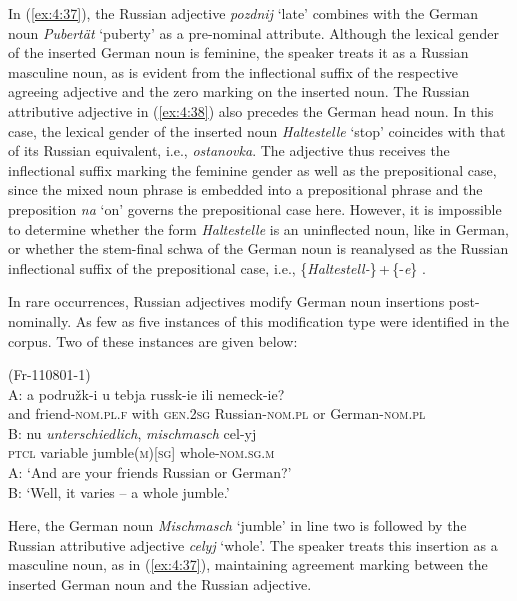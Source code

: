 \noindent In (\ref{ex:4:37}), the Russian adjective \textit{pozdnij} `late' combines with the German noun \textit{Pubertät} `puberty' as a pre-nominal attribute. Although the lexical gender of the inserted German noun is feminine, the speaker treats it as a Russian masculine noun, as is evident from the inflectional suffix of the respective agreeing adjective and the zero marking on the inserted noun. The Russian attributive adjective in (\ref{ex:4:38}) also precedes the German head noun. In this case, the lexical gender of the inserted noun \textit{Haltestelle} `stop' coincides with that of its Russian equivalent, i.e., \textit{ostanovka}. The adjective thus receives the inflectional suffix marking the feminine gender as well as the prepositional case, since the mixed noun phrase is embedded into a prepositional phrase and the preposition \textit{na} `on' governs the prepositional case here. However, it is impossible to determine whether the form \textit{Haltestelle} is an uninflected noun, like in German, or whether the stem-final schwa of the German noun is reanalysed as the Russian inflectional suffix of the prepositional case, i.e., \{\textit{Haltestell-}\}\,+\,\{{-\textit{e}}\} \citep[cf.][276]{zdan-trubc-01}.

In rare occurrences, Russian adjectives  modify German noun insertions post-nominally. As few as five instances of this modification type were identified in the corpus. Two of these instances are given below:

\ea
\label{ex4.41}
(Fr-110801-1)\\
\gll A: a podružk-i u tebja russk-ie ili   nemeck-ie?\\
	{} and friend-\textsc{nom.pl.f} with \textsc{gen.2sg} Russian-\textsc{nom.pl} or  German-\textsc{nom.pl}\\
\glt
\gll B: nu \textit{unterschiedlich}, \textit{mischmasch} cel-yj\\
	{} \textsc{ptcl} variable jumble(\textsc{m})[\textsc{sg}] whole-\textsc{nom.sg.m}\\
\glt
A: `And are your friends Russian or German?'\\
B: `Well, it varies -- a whole jumble.'\\
\z

\noindent Here, the German noun \textit{Mischmasch} `jumble' in line two is followed by the Russian attributive adjective \textit{celyj} `whole'. The speaker treats this insertion as a masculine noun, as in (\ref{ex:4:37}), maintaining agreement marking between the inserted German noun and the Russian adjective.

